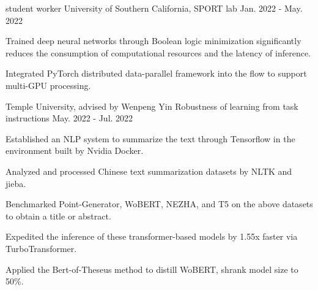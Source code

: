 
\begin{cventries}

  \cventry
    {student worker} %
    {University of Southern California, SPORT lab} %
    {} %
    {Jan. 2022 - May. 2022} %
    { 
     \begin{cvitems} %
       \item{Trained deep neural networks through Boolean logic minimization significantly reduces the consumption of computational resources and the latency of inference.}
       \item{Integrated PyTorch distributed data-parallel framework into the flow to support multi-GPU processing.}
     \end{cvitems}
    }

 \vspace{0mm} 


  \cventry
    {Temple University, advised by Wenpeng Yin} %
    {Robustness of learning from task instructions} %
    {} %
    {May. 2022 - Jul. 2022} %
    { 
     \begin{cvitems} %
        \item{Established an NLP system to summarize the text through Tensorflow in the environment built by Nvidia Docker.}
        \item{Analyzed and processed Chinese text summarization datasets by NLTK and jieba.}
        \item{Benchmarked Point-Generator, WoBERT, NEZHA, and T5 on the above datasets to obtain a title or abstract. }
        \item{Expedited the inference of these transformer-based models by 1.55x faster via TurboTransformer.}
        \item{Applied the Bert-of-Theseus method to distill WoBERT, shrank model size to 50\%.}
    \end{cvitems}
    }

 \vspace{0mm} 
\end{cventries}
